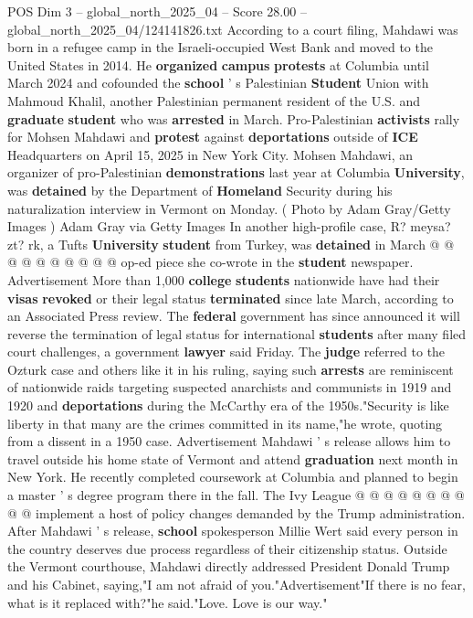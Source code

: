 \begin{textsample}{POS Dim 3 – global\_north\_2025\_04 – Score 28.00 – global\_north\_2025\_04/124141826.txt}
According to a court filing, Mahdawi was born in a refugee camp in the Israeli-occupied West Bank and moved to the United States in 2014.
He \textbf{organized} \textbf{campus} \textbf{protests} at Columbia until March 2024 and cofounded the \textbf{school} ' s Palestinian \textbf{Student} Union with Mahmoud Khalil, another Palestinian permanent resident of the U.S. and \textbf{graduate} \textbf{student} who was \textbf{arrested} in March.
Pro-Palestinian \textbf{activists} rally for Mohsen Mahdawi and \textbf{protest} against \textbf{deportations} outside of \textbf{ICE} Headquarters on April 15, 2025 in New York City.
Mohsen Mahdawi, an organizer of pro-Palestinian \textbf{demonstrations} last year at Columbia \textbf{University}, was \textbf{detained} by the Department of \textbf{Homeland} Security during his naturalization interview in Vermont on Monday. ( Photo by Adam Gray/Getty Images ) Adam Gray via Getty Images In another high-profile case, R? meysa? zt? rk, a Tufts \textbf{University} \textbf{student} from Turkey, was \textbf{detained} in March @ @ @ @ @ @ @ @ @ @ op-ed piece she co-wrote in the \textbf{student} newspaper.
Advertisement More than 1,000 \textbf{college} \textbf{students} nationwide have had their \textbf{visas} \textbf{revoked} or their legal status \textbf{terminated} since late March, according to an Associated Press review.
The \textbf{federal} government has since announced it will reverse the termination of legal status for international \textbf{students} after many filed court challenges, a government \textbf{lawyer} said Friday.
The \textbf{judge} referred to the Ozturk case and others like it in his ruling, saying such \textbf{arrests} are reminiscent of nationwide raids targeting suspected anarchists and communists in 1919 and 1920 and \textbf{deportations} during the McCarthy era of the 1950s."Security is like liberty in that many are the crimes committed in its name,"he wrote, quoting from a dissent in a 1950 case.
Advertisement Mahdawi ' s release allows him to travel outside his home state of Vermont and attend \textbf{graduation} next month in New York.
He recently completed coursework at Columbia and planned to begin a master ' s degree program there in the fall.
The Ivy League @ @ @ @ @ @ @ @ @ @ implement a host of policy changes demanded by the Trump administration.
After Mahdawi ' s release, \textbf{school} spokesperson Millie Wert said every person in the country deserves due process regardless of their citizenship status.
Outside the Vermont courthouse, Mahdawi directly addressed President Donald Trump and his Cabinet, saying,"I am not afraid of you."Advertisement"If there is no fear, what is it replaced with?"he said."Love.
Love is our way."

\end{textsample}
